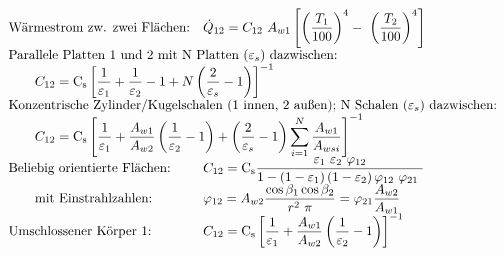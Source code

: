 \[\begin{array}{llc}
		\text{Wärmestrom zw. zwei Flächen:}               & \dot{Q}_{12} = C_{12}\ A_{w1}\left[\left(\dfrac{T_1}{100}\right)^4 -\ \left( \dfrac{T_2}{100} \right) ^4\right]                                                                                     &                                                                         \\
		\multicolumn{2}{l}{ \text{Parallele Platten 1 und 2 mit N Platten ($\varepsilon_s$) dazwischen:}}                                                                                                                                                       &                                                                         \\
		\multicolumn{2}{l}{ \qquad C_{12} = \Cs\left[\dfrac{1}{\varepsilon_1} + \dfrac{1}{\varepsilon_2} -1 + N \left(\dfrac{2}{\varepsilon_s} - 1\right)\right] ^{-1}}                                                                                         &                                                                         \\
		\multicolumn{3}{l}{	\text{Konzentrische Zylinder/Kugelschalen (1 innen, 2 außen); N Schalen ($ \varepsilon_s $) dazwischen:}}                                                                                                                                                                                                     \\
		\multicolumn{2}{l}{	\qquad C_{12} = \Cs\left[ \dfrac{1}{\varepsilon_1} + \dfrac{A_{w1}}{A_{w2}} \left(\dfrac{1}{\varepsilon_2} -1\right) + \left(\dfrac{2}{\varepsilon_s} - 1\right) \displaystyle\sum_{i=1}^{N} \dfrac{A_{w1}}{A_{wsi}} \right] ^{-1}} &                                                                         \\
		\text{Beliebig orientierte Flächen:}              & C_{12} = \Cs\dfrac{\varepsilon_1\ \varepsilon_2\ \varphi_{12}}{1-\left(1- \varepsilon_1\right)\left(1-\varepsilon_2\right) \varphi_{12}\ \varphi_{21}\ }                                            &                                                                         \\
		\text{\qquad mit Einstrahlzahlen:}                & \varphi_{12} = A_{w2} \dfrac{\cos{\beta_1}\cos{\beta_2}}{r^2\ \pi}   =  \varphi_{21} \dfrac{A_{w2}}{A_{w1}}                                                                                         &                                                                         \\
		\text{Umschlossener Körper 1:}                    & C_{12}  = \Cs \left[ \dfrac{1}{\varepsilon_1} +  \dfrac{A_{w1}}{A_{w2}} \left(\dfrac{1}{\varepsilon_2} - 1\right) \right]^{-1}                                                                      &                                                                         \\

\end{array}\]

